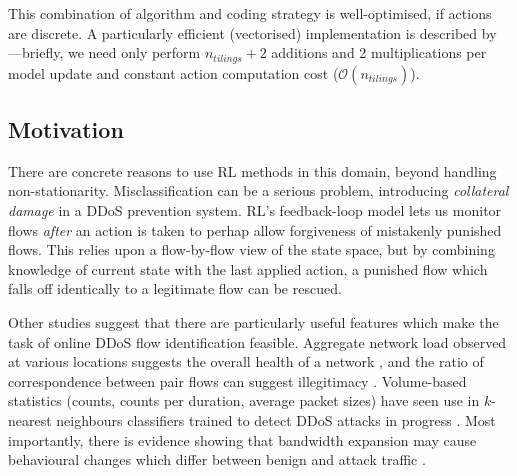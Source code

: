 \documentclass[10pt, times, conference, letterpaper]{IEEEtran}
\begin{document}
This combination of algorithm and coding strategy is well-optimised, if actions are discrete.
A particularly efficient (vectorised) implementation is described by \textcite{RL2E}---briefly, we need only perform $n_{\mathit{tilings}} + 2$ additions and \num{2} multiplications per model update and constant action computation cost ($\mathcal{O}(n_{\mathit{tilings}})$).

\subsection{Motivation}\label{sec:motivation}
There are concrete reasons to use RL methods in this domain, beyond handling non-stationarity.
Misclassification can be a serious problem, introducing \emph{collateral damage} in a DDoS prevention system.
RL's feedback-loop model lets us monitor flows \emph{after} an action is taken to perhap allow forgiveness of mistakenly punished flows.
This relies upon a flow-by-flow view of the state space, but by combining knowledge of current state with the last applied action, a punished flow which falls off identically to a legitimate flow can be rescued.

Other studies suggest that there are particularly useful features which make the task of online DDoS flow identification feasible.
Aggregate network load observed at various locations suggests the overall health of a network \cite{DBLP:journals/eaai/MalialisK15}, and the ratio of correspondence between pair flows can suggest illegitimacy \cite{DBLP:conf/ndss/Rossow14}.
Volume-based statistics (counts, counts per duration, average packet sizes) have seen use in $k$-nearest neighbours classifiers trained to detect DDoS attacks in progress \cite{DBLP:conf/dsn/LeeKSPY17}.
Most importantly, there is evidence showing that bandwidth expansion may cause behavioural changes  which differ between benign and attack traffic \cite{DBLP:conf/ndss/KangGS16}.
\end{document}
